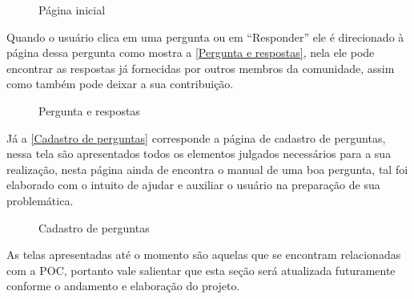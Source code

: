 \begin{figure}[htb]
\centering
\caption{\label{Home Page} Página inicial}

\end{figure}
\FloatBarrier

Quando o usuário clica em uma pergunta ou em ``Responder'' ele é direcionado à página dessa pergunta como mostra a \autoref{Pergunta e respostas}, nela ele pode encontrar as respostas já fornecidas por outros membros da comunidade, assim como também pode deixar a sua contribuição.

\begin{figure}[htb]
\centering
\caption{\label{Pergunta e respostas} Pergunta e respostas}

\end{figure}
\FloatBarrier

Já a \autoref{Cadastro de perguntas} corresponde a página de cadastro de perguntas, nessa tela são apresentados todos os elementos julgados necessários para a sua realização, nesta página ainda de encontra o manual de uma boa pergunta, tal foi elaborado com o intuito de ajudar e auxiliar o usuário na preparação de sua problemática. 

\begin{figure}[htb]
\centering
\caption{\label{Cadastro de perguntas} Cadastro de perguntas}

\end{figure}
\FloatBarrier

As telas apresentadas até o momento são aquelas que se encontram relacionadas com a \gls{POC}, portanto vale salientar que esta seção será atualizada futuramente conforme o andamento e elaboração do projeto.

